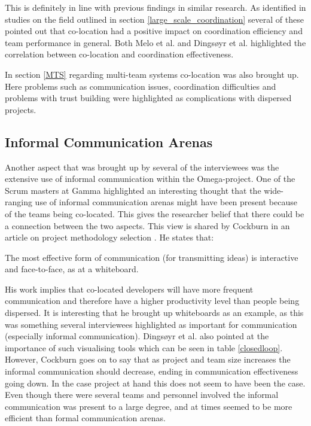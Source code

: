 This is definitely in line with previous findings in similar research. As identified in studies on the field outlined in section \ref{large_scale_coordination} several of these pointed out that co-location had a positive impact on coordination efficiency and team performance in general. Both Melo et al. \cite{Melo2013} and Dingsøyr et al. \cite{Dingsoyr2013c} highlighted the correlation between co-location and coordination effectiveness.

In section \ref{MTS} regarding multi-team systems co-location was also brought up. Here problems such as communication issues, coordination difficulties and problems with trust building were highlighted as complications with dispersed projects.

\subsection{Informal Communication Arenas}

Another aspect that was brought up by several of the interviewees was the extensive use of informal communication within the Omega-project. One of the Scrum masters at Gamma highlighted an interesting thought that the wide-ranging use of informal communication arenas might have been present because of the teams being co-located. This gives the researcher belief that there could be a connection between the two aspects. This view is shared by Cockburn in an article on project methodology selection \cite{Cockburn2000}. He states that:

\begin{fancyquotes}
The most effective form of communication (for transmitting ideas) is interactive and face-to-face, as at a whiteboard.
\end{fancyquotes}

His work implies that co-located developers will have more frequent communication and therefore have a higher productivity level than people being dispersed. It is interesting that he brought up whiteboards as an example, as this was something several interviewees highlighted as important for communication (especially informal communication). Dingsøyr et al. \cite{Dingsoyr2013c} also pointed at the importance of such visualising tools which can be seen in table \ref{closedloop}. However, Cockburn goes on to say that as project and team size increases the informal communication should decrease, ending in communication effectiveness going down. In the case project at hand this does not seem to have been the case. Even though there were several teams and personnel involved the informal communication was present to a large degree, and at times seemed to be more efficient than formal communication arenas.

